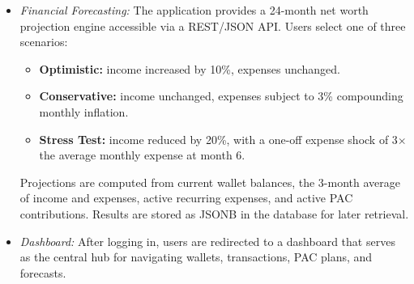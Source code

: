 \begin{itemize}
    \item \textit{Financial Forecasting:} The application provides a 24-month net worth projection engine accessible via a REST/JSON API. Users select one of three scenarios:
    \begin{itemize}
        \item \textbf{Optimistic:} income increased by 10\%, expenses unchanged.
        \item \textbf{Conservative:} income unchanged, expenses subject to 3\% compounding monthly inflation.
        \item \textbf{Stress Test:} income reduced by 20\%, with a one-off expense shock of 3$\times$ the average monthly expense at month 6.
    \end{itemize}
    Projections are computed from current wallet balances, the 3-month average of income and expenses, active recurring expenses, and active PAC contributions. Results are stored as JSONB in the database for later retrieval.

    \item \textit{Dashboard:} After logging in, users are redirected to a dashboard that serves as the central hub for navigating wallets, transactions, PAC plans, and forecasts.

\end{itemize}
